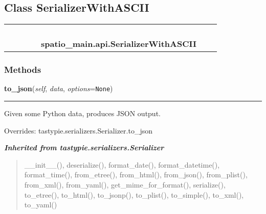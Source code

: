 \subsection{Class SerializerWithASCII}

    \label{spatio_main:api:SerializerWithASCII}
\begin{tabular}{cccccccc}
\multicolumn{2}{r}{\settowidth{\BCL}{object}\multirow{2}{\BCL}{object}}
&&
&&
  \\\cline{3-3}
  &&\multicolumn{1}{c|}{}
&&
&&
  \\
\multicolumn{4}{r}{\settowidth{\BCL}{tastypie.serializers.Serializer}\multirow{2}{\BCL}{tastypie.serializers.Serializer}}
&&
  \\\cline{5-5}
  &&&&\multicolumn{1}{c|}{}
&&
  \\
&&&&\multicolumn{2}{l}{\textbf{spatio\_main.api.SerializerWithASCII}}
\end{tabular}



  \subsubsection{Methods}

    \vspace{0.5ex}

\hspace{.8\funcindent}\begin{boxedminipage}{\funcwidth}

    \raggedright \textbf{to\_json}(\textit{self}, \textit{data}, \textit{options}={\tt None})

    \vspace{-1.5ex}

    \rule{\textwidth}{0.5\fboxrule}
\setlength{\parskip}{2ex}
    Given some Python data, produces JSON output.

\setlength{\parskip}{1ex}
      Overrides: tastypie.serializers.Serializer.to\_json

    \end{boxedminipage}


\large{\textbf{\textit{Inherited from tastypie.serializers.Serializer}}}

\begin{quote}
\_\_init\_\_(), deserialize(), format\_date(), format\_datetime(), format\_time(), from\_etree(), from\_html(), from\_json(), from\_plist(), from\_xml(), from\_yaml(), get\_mime\_for\_format(), serialize(), to\_etree(), to\_html(), to\_jsonp(), to\_plist(), to\_simple(), to\_xml(), to\_yaml()
\end{quote}


